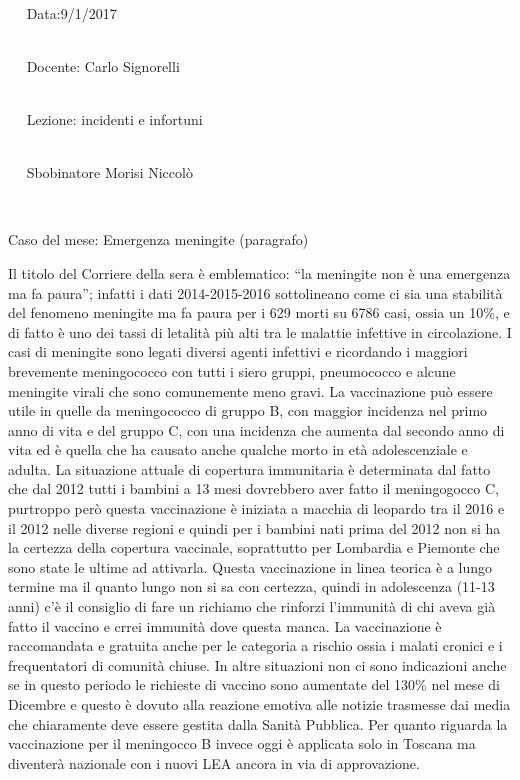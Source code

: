 \documentclass[]{article}
\date{}
\begin{document}
~~~~~~~~~~~~~~~~~~~~~~~~~~~~~~~~~~~~~~~~~~~~~~~~~~~~~~~~~~~~~~~~~~~~~~~~~~
Data:9/1/2017

~~~~~~~~~~~~~~~~~~~~~~~~~~~~~~~~~~~~~~~~~~~~~~~~~~~~~~~~~~~~~~~~~~~~~~~~~~
Docente: Carlo Signorelli

~~~~~~~~~~~~~~~~~~~~~~~~~~~~~~~~~~~~~~~~~~~~~~~~~~~~~~~~~~~~~~~~~~~~~~~~~~
Lezione: incidenti e infortuni

~~~~~~~~~~~~~~~~~~~~~~~~~~~~~~~~~~~~~~~~~~~~~~~~~~~~~~~~~~~~~~~~~~~~~~~~~~
Sbobinatore Morisi Niccolò

~

Caso del mese: Emergenza meningite (paragrafo)

Il titolo del Corriere della sera è emblematico: ``la meningite non è
una emergenza ma fa paura''; infatti i dati 2014-2015-2016 sottolineano
come ci sia una stabilità del fenomeno meningite ma fa paura per i 629
morti su 6786 casi, ossia un 10\%, e di fatto è uno dei tassi di
letalità più alti tra le malattie infettive in circolazione. I casi di
meningite sono legati diversi agenti infettivi e ricordando i maggiori
brevemente meningococco con tutti i siero gruppi, pneumococco e alcune
meningite virali che sono comunemente meno gravi. La vaccinazione può
essere utile in quelle da meningococco di gruppo B, con maggior
incidenza nel primo anno di vita e del gruppo C, con una incidenza che
aumenta dal secondo anno di vita ed è quella che ha causato anche
qualche morto in età adolescenziale e adulta. La situazione attuale di
copertura immunitaria è determinata dal fatto che dal 2012 tutti i
bambini a 13 mesi dovrebbero aver fatto il meningogocco C, purtroppo
però questa vaccinazione è iniziata a macchia di leopardo tra il 2016 e
il 2012 nelle diverse regioni e quindi per i bambini nati prima del 2012
non si ha la certezza della copertura vaccinale, soprattutto per
Lombardia e Piemonte che sono state le ultime ad attivarla. Questa
vaccinazione in linea teorica è a lungo termine ma il quanto lungo non
si sa con certezza, quindi in adolescenza (11-13 anni) c'è il consiglio
di fare un richiamo che rinforzi l'immunità di chi aveva già fatto il
vaccino e crrei immunità dove questa manca. La vaccinazione è
raccomandata e gratuita anche per le categoria a rischio ossia i malati
cronici e i frequentatori di comunità chiuse. In altre situazioni non ci
sono indicazioni anche se in questo periodo le richieste di vaccino sono
aumentate del 130\% nel mese di Dicembre e questo è dovuto alla reazione
emotiva alle notizie trasmesse dai media che chiaramente deve essere
gestita dalla Sanità Pubblica. Per quanto riguarda la vaccinazione per
il meningocco B invece oggi è applicata solo in Toscana ma diventerà
nazionale con i nuovi LEA ancora in via di approvazione.
\end{document}
